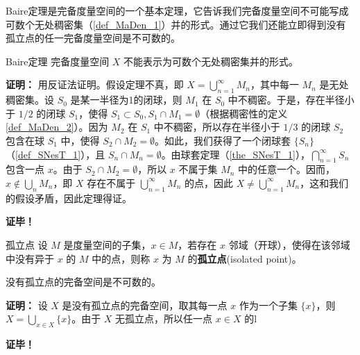 
Baire定理是完备度量空间的一个基本定理，它告诉我们完备度量空间不可能写成可数个无处稠密集（\autoref{def_MaDen_1}）并的形式。通过它我们还能立即得到没有孤立点的任一完备度量空间是不可数的。

\begin{theorem}{Baire定理}
完备度量空间 $X$ 不能表示为可数个无处稠密集并的形式。
\end{theorem}
\textbf{证明：}
用反证法证明。假设定理不真，即 $X=\bigcup_{n=1}^\infty M_n$，其中每一 $M_n$ 是无处稠密集。设 $S_0$ 是某一半径为1的闭球，则 $M_1$ 在 $S_0$ 中不稠密。于是，存在半径小于 $1/2$ 的闭球 $S_1$，使得 $S_1\subset S_0,S_1\cap M_1=\emptyset$（根据稠密性的定义\autoref{def_MaDen_2}）。因为 $M_2$ 在 $S_1$ 中不稠密，所以存在半径小于 $1/3$ 的闭球 $S_2$ 包含在球 $S_1$ 中，使得 $S_2\cap M_2=\emptyset$。如此，我们获得了一个闭球套 $\{S_n\}$ （\autoref{def_SNesT_1}），且 $S_n\cap M_n=\emptyset$。由球套定理（\autoref{the_SNesT_1}），$\bigcap_{n=1}^\infty S_n$ 包含一点 $x$。由于 $S_2\cap M_2=\emptyset$，所以 $x$ 不属于集 $M_n$ 中的任意一个。因而，$x\notin \bigcup\limits_n M_n$，即 $X$ 存在不属于 $\bigcup_{n=1}^\infty M_n$ 的点，因此 $X\neq\bigcup_{n=1}^\infty M_n$，这和我们的假设矛盾，因此定理得证。

\textbf{证毕！}


\begin{definition}{孤立点}
设 $M$ 是度量空间的子集，$x\in M$，若存在 $x$ 邻域（开球），使得在该邻域中没有异于 $x$ 的 $M$ 中的点，则称 $x$ 为 $M$ 的\textbf{孤立点}(isolated point)。
\end{definition}

\begin{corollary}{}
没有孤立点的完备空间是不可数的。
\end{corollary}

\textbf{证明：}
设 $X$ 是没有孤立点的完备空间，取其每一点 $x$ 作为一个子集 $\{x\}$，则 $X=\bigcup\limits_{x\in X}\{x\}$。由于 $X$ 无孤立点，所以任一点 $x\in X$ 的l 

\textbf{证毕！}



